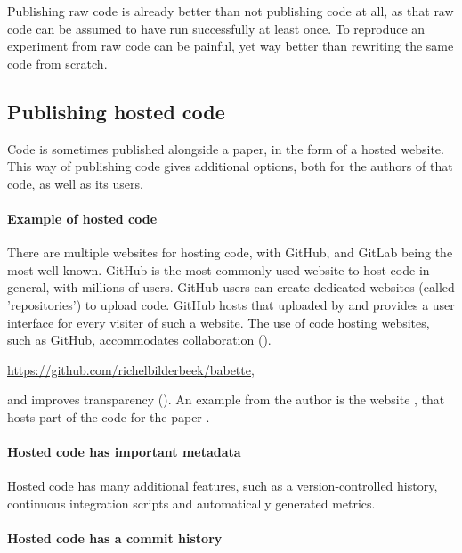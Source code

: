 Publishing raw code is already better than not publishing code at all,
as that raw code can be assumed to have run successfully at least once.
To reproduce an experiment from raw code can be painful, 
yet way better than rewriting the same code from scratch.

\subsection{Publishing hosted code}

Code is sometimes published alongside a paper, 
in the form of a hosted website.
This way of publishing code gives additional options,
both for the authors of that code, as well as its users.

\paragraph{Example of hosted code}

There are multiple websites for hosting code, with GitHub,
and GitLab being the most well-known.
GitHub is the most commonly used website to host code in general,
with millions of users.
GitHub users can create dedicated websites (called 'repositories')
to upload code. GitHub hosts that uploaded by and provides
a user interface for every visiter of such a website.
The use of code hosting websites, such as GitHub,
accommodates collaboration (\cite{perez2016ten}).
\begin{sloppypar}\url{https://github.com/richelbilderbeek/babette},\end{sloppypar}
and improves transparency (\cite{gorgolewski2016practical}).
An example from the author is the website \cite{bbbqarticleissue157},
that hosts part of the code for the paper \cite{bilderbeek2022transmembrane}.

\paragraph{Hosted code has important metadata}

Hosted code has many additional features, such as
a version-controlled history, continuous integration scripts
and automatically generated metrics.

\paragraph{Hosted code has a commit history}

